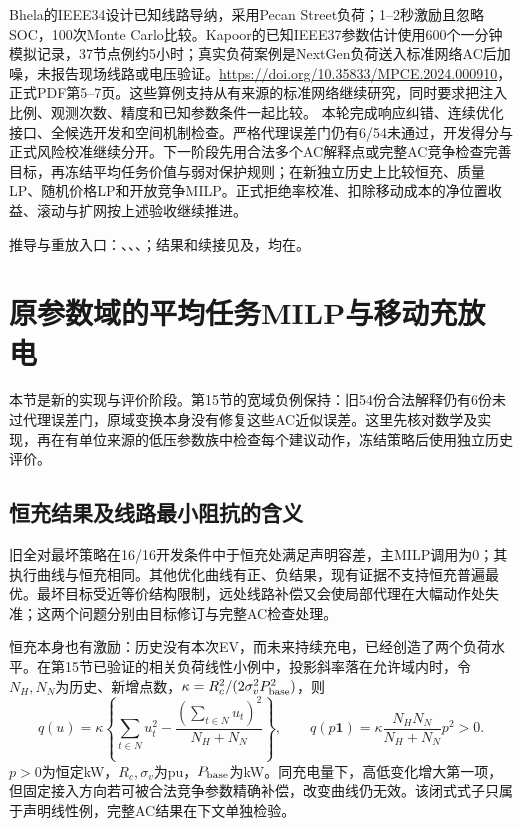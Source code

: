 \documentclass[UTF8,fontset=fandol,11pt,a4paper]{ctexart}
\begin{document}
Bhela的IEEE34设计已知线路导纳，采用Pecan Street负荷；1--2秒激励且忽略SOC，100次Monte Carlo比较\cite{bhela-probing}。Kapoor的已知IEEE37参数估计使用600个一分钟模拟记录，37节点例约5小时；真实负荷案例是NextGen负荷送入标准网络AC后加噪，未报告现场线路或电压验证。\url{https://doi.org/10.35833/MPCE.2024.000910}，正式PDF第5--7页。这些算例支持从有来源的标准网络继续研究，同时要求把注入比例、观测次数、精度和已知参数条件一起比较。
本轮完成响应纠错、连续优化接口、全候选开发和空间机制检查。严格代理误差门仍有6/54未通过，开发得分与正式风险校准继续分开。下一阶段先用合法多个AC解释点或完整AC竞争检查完善目标，再冻结平均任务价值与弱对保护规则；在新独立历史上比较恒充、质量LP、随机价格LP和开放竞争MILP。正式拒绝率校准、扣除移动成本的净位置收益、滚动与扩网按上述验收继续推进。

推导与重放入口：、、、；结果和续接见及，均在。


\clearpage
\section{原参数域的平均任务MILP与移动充放电}
\label{sec:original-mean-milp}
本节是新的实现与评价阶段。第15节的宽域负例保持：旧54份合法解释仍有6份未过代理误差门，原域变换本身没有修复这些AC近似误差。这里先核对数学及实现，再在有单位来源的低压参数族中检查每个建议动作，冻结策略后使用独立历史评价。

\subsection{恒充结果及线路最小阻抗的含义}
旧全对最坏策略在16/16开发条件中于恒充处满足声明容差，主MILP调用为0；其执行曲线与恒充相同。其他优化曲线有正、负结果，现有证据不支持恒充普遍最优。最坏目标受近等价结构限制，远处线路补偿又会使局部代理在大幅动作处失准；这两个问题分别由目标修订与完整AC检查处理。

恒充本身也有激励：历史没有本次EV，而未来持续充电，已经创造了两个负荷水平。在第15节已验证的相关负荷线性小例中，投影斜率落在允许域内时，令$N_H,N_N$为历史、新增点数，$\kappa=R_c^2/(2\sigma_v^2P_{\rm base}^2)$，则
\[
q(u)=\kappa\left\{\sum_{t\in N}u_t^2-
\frac{(\sum_{t\in N}u_t)^2}{N_H+N_N}\right\},\qquad
q(p\mathbf1)=\kappa\frac{N_HN_N}{N_H+N_N}p^2>0.
\]
$p>0$为恒定kW，$R_c,\sigma_v$为pu，$P_{\rm base}$为kW。同充电量下，高低变化增大第一项，但固定接入方向若可被合法竞争参数精确补偿，改变曲线仍无效。该闭式式子只属于声明线性例，完整AC结果在下文单独检验。
\end{document}
